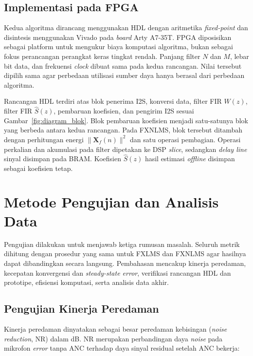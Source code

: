 \subsection{Implementasi pada FPGA}
\label{sec:implementasi_fpga}

Kedua algoritma dirancang menggunakan HDL dengan aritmetika \emph{fixed-point} dan disintesis menggunakan Vivado pada \emph{board} Arty A7-35T. FPGA diposisikan sebagai platform untuk mengukur biaya komputasi algoritma, bukan sebagai fokus perancangan perangkat keras tingkat rendah. Panjang filter $N$ dan $M$, lebar bit data, dan frekuensi \emph{clock} dibuat sama pada kedua rancangan. Nilai tersebut dipilih sama agar perbedaan utilisasi sumber daya hanya berasal dari perbedaan algoritma.

Rancangan HDL terdiri atas blok penerima I2S, konversi data, filter FIR $W(z)$, filter FIR $\hat{S}(z)$, pembaruan koefisien, dan pengirim I2S sesuai Gambar~\ref{fig:diagram_blok}. Blok pembaruan koefisien menjadi satu-satunya blok yang berbeda antara kedua rancangan. Pada FXNLMS, blok tersebut ditambah dengan perhitungan energi $\|\mathbf{X}_f(n)\|^2$ dan satu operasi pembagian. Operasi perkalian dan akumulasi pada filter dipetakan ke DSP \emph{slice}, sedangkan \emph{delay line} sinyal disimpan pada BRAM. Koefisien $\hat{S}(z)$ hasil estimasi \emph{offline} disimpan sebagai koefisien tetap.

\section{Metode Pengujian dan Analisis Data}
\label{sec:pengujian}

Pengujian dilakukan untuk menjawab ketiga rumusan masalah. Seluruh metrik dihitung dengan prosedur yang sama untuk FXLMS dan FXNLMS agar hasilnya dapat dibandingkan secara langsung. Pembahasan mencakup kinerja peredaman, kecepatan konvergensi dan \emph{steady-state error}, verifikasi rancangan HDL dan prototipe, efisiensi komputasi, serta analisis data akhir.

\subsection{Pengujian Kinerja Peredaman}
\label{sec:uji_peredaman}

Kinerja peredaman dinyatakan sebagai besar peredaman kebisingan (\emph{noise reduction}, NR) dalam dB. NR merupakan perbandingan daya \emph{noise} pada mikrofon \emph{error} tanpa ANC terhadap daya sinyal residual setelah ANC bekerja:

